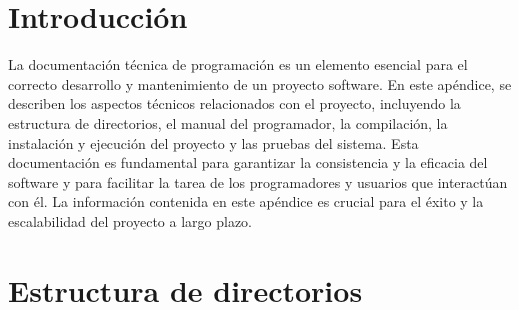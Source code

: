 
\section{Introducción}

La documentación técnica de programación es un elemento esencial para el correcto desarrollo y mantenimiento de un proyecto software. En este apéndice, se describen los aspectos técnicos relacionados con el proyecto, incluyendo la estructura de directorios, el manual del programador, la compilación, la instalación y ejecución del proyecto y las pruebas del sistema. Esta documentación es fundamental para garantizar la consistencia y la eficacia del software y para facilitar la tarea de los programadores y usuarios que interactúan con él. La información contenida en este apéndice es crucial para el éxito y la escalabilidad del proyecto a largo plazo.

\section{Estructura de directorios}

